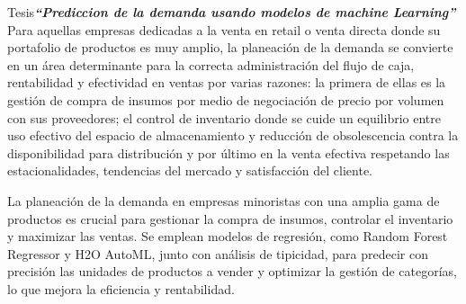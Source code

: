 \vspace{1\baselineskip}
Tesis\textbf{\textit{“Prediccion de la demanda usando modelos de machine Learning” }}\cite{hincapie2021prediccion} Para aquellas empresas dedicadas a la venta en retail o venta directa donde su portafolio de productos es muy amplio, la planeación de la demanda se convierte en un área determinante para la correcta administración del flujo de caja, rentabilidad y efectividad en ventas por varias razones: la primera de ellas es la gestión de compra de insumos por medio de negociación de precio por volumen con sus proveedores; el control de inventario donde se cuide un equilibrio entre uso efectivo del espacio de almacenamiento y reducción de obsolescencia contra la disponibilidad para distribución y por último en la venta efectiva respetando las estacionalidades, tendencias del mercado y satisfacción del cliente.

\vspace{1\baselineskip}
La planeación de la demanda en empresas minoristas con una amplia gama de productos es crucial para gestionar la compra de insumos, controlar el inventario y maximizar las ventas. Se emplean modelos de regresión, como Random Forest Regressor y H2O AutoML, junto con análisis de tipicidad, para predecir con precisión las unidades de productos a vender y optimizar la gestión de categorías, lo que mejora la eficiencia y rentabilidad.

